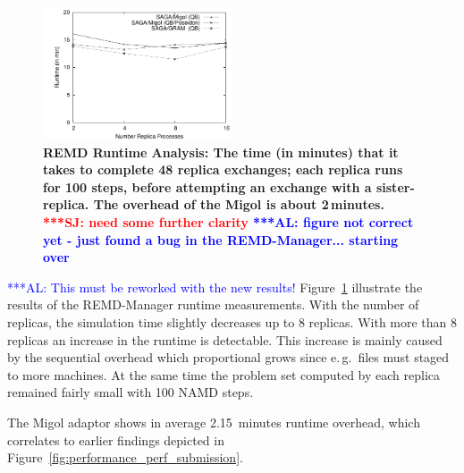 \documentclass[times, 10pt, twocolumn]{article}
\newcommand{\alnote}[1]{ {\textcolor{blue} { ***AL: #1 }}}
\newcommand{\jhanote}[1]{ {\textcolor{red} { ***SJ: #1 }}}
\newcommand{\alnote}[1]{}
\newcommand{\jhanote}[1]{}
\newcommand{\up}{\vspace*{-1em}}
\begin{document}
\begin{figure}[htb]
    \centering
    \hspace*{-20pt}
        \includegraphics[width=0.5\textwidth]{performance/perf_remd.pdf}
        \caption{\small \bf REMD Runtime Analysis: The time (in minutes) that it
          takes to complete 48 replica exchanges; each replica
          runs for 100 steps, before attempting an exchange with a
          sister-replica. The overhead of the Migol is about 2\,minutes. \jhanote{need some further clarity}     
          \alnote{figure not correct yet - just found a bug in the REMD-Manager... starting over}
          \up\up}
    \label{fig:performance_perf_runtime}
\end{figure}     

\alnote{This must be reworked with the new results!}
Figure~\ref{fig:performance_perf_runtime} illustrate the results of
the REMD-Manager runtime measurements. With the number of replicas, the simulation 
time slightly decreases up to 8 replicas. With more than
8 replicas an increase in the runtime is detectable. This increase is mainly caused
by the sequential overhead which proportional grows since e.\,g.\ files must staged to more machines. 
At the same time the problem set computed by each replica remained fairly small with 100 NAMD steps. 


The Migol adaptor shows in average 2.15\, minutes runtime overhead, which correlates
to earlier findings depicted in Figure~\ref{fig:performance_perf_submission}.


\end{document}
